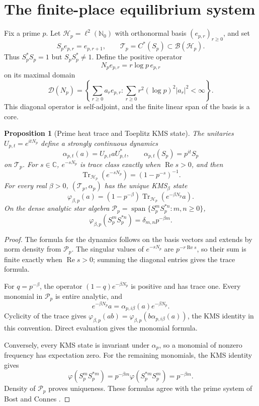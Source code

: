 \documentclass[11pt]{article}
\theoremstyle{plain}
\newtheorem{proposition}[theorem]{Proposition}
\theoremstyle{definition}
\theoremstyle{remark}
\begin{document}
\section{The finite-place equilibrium system}

Fix a prime \(p\).  Let \(\mathscr H_p=\ell^2(\mathbb N_0)\) with
orthonormal basis \((e_{p,r})_{r\geq0}\), and set
\[
 S_pe_{p,r}=e_{p,r+1},\qquad \mathcal T_p=C^*(S_p)
 \subset\mathcal B(\mathscr H_p).
\]
Thus \(S_p^*S_p=1\) but \(S_pS_p^*\ne1\).  Define the positive operator
\[
 N_pe_{p,r}=r\log p\,e_{p,r}
\]
on its maximal domain
\[
 \mathcal D(N_p)=
 \left\{\sum_{r\geq0}a_re_{p,r}:
 \sum_{r\geq0}r^2(\log p)^2|a_r|^2<\infty\right\}.
\]
This diagonal operator is self-adjoint, and the finite linear span of the
basis is a core.

\begin{proposition}[Prime heat trace and Toeplitz KMS state]
\label{prop:prime-kms}
The unitaries \(U_{p,t}=e^{itN_p}\) define a strongly continuous dynamics
\[
 \alpha_{p,t}(a)=U_{p,t}aU_{p,t}^*,\qquad
 \alpha_{p,t}(S_p)=p^{it}S_p
\]
on \(\mathcal T_p\).  For \(s\in\mathbb C\),
\(e^{-sN_p}\) is trace class exactly when \(\operatorname{Re}s>0\), and
then
\[
 \operatorname{Tr}_{\mathscr H_p}(e^{-sN_p})=(1-p^{-s})^{-1}.
\]
For every real \(\beta>0\), \((\mathcal T_p,\alpha_p)\) has the unique
KMS\(_\beta\) state
\[
 \varphi_{\beta,p}(a)
 =(1-p^{-\beta})
 \operatorname{Tr}_{\mathscr H_p}(e^{-\beta N_p}a).
\]
On the dense analytic star algebra
\(\mathcal P_p=\operatorname{span}\{S_p^mS_p^{*n}:m,n\geq0\}\),
\[
 \varphi_{\beta,p}(S_p^mS_p^{*n})
 =\delta_{m,n}p^{-\beta m}.
\]
\end{proposition}

\begin{proof}
The formula for the dynamics follows on the basis vectors and extends by
norm density from \(\mathcal P_p\).  The singular values of
\(e^{-sN_p}\) are \(p^{-r\operatorname{Re}s}\), so their sum is finite
exactly when \(\operatorname{Re}s>0\); summing the diagonal entries gives
the trace formula.

For \(q=p^{-\beta}\), the operator
\((1-q)e^{-\beta N_p}\) is positive and has trace one.  Every monomial in
\(\mathcal P_p\) is entire analytic, and
\[
 e^{-\beta N_p}a=\alpha_{p,i\beta}(a)e^{-\beta N_p}.
\]
Cyclicity of the trace gives
\(\varphi_{\beta,p}(ab)=
\varphi_{\beta,p}(b\alpha_{p,i\beta}(a))\), the KMS identity in this
convention.  Direct evaluation gives the monomial formula.

Conversely, every KMS state is invariant under \(\alpha_p\), so a monomial
of nonzero frequency has expectation zero.  For the remaining monomials,
the KMS identity gives
\[
 \varphi(S_p^mS_p^{*m})
 =p^{-\beta m}\varphi(S_p^{*m}S_p^m)=p^{-\beta m}.
\]
Density of \(\mathcal P_p\) proves uniqueness.  These formulas agree with
the prime system of Bost and Connes
\cite[\S2, Propositions~7--8]{BostConnes1995}.
\end{proof}
\end{document}
